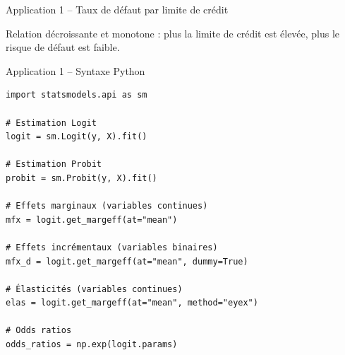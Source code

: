 \documentclass[11pt,aspectratio=169]{beamer}
\begin{document}
\begin{frame}{Application 1 -- Taux de défaut par limite de crédit}

\begin{center}
\end{center}

Relation décroissante et monotone : plus la limite de crédit est élevée,
plus le risque de défaut est faible.

\end{frame}

\begin{frame}[fragile]{Application 1 -- Syntaxe Python}

\begin{verbatim}
import statsmodels.api as sm

# Estimation Logit
logit = sm.Logit(y, X).fit()

# Estimation Probit
probit = sm.Probit(y, X).fit()

# Effets marginaux (variables continues)
mfx = logit.get_margeff(at="mean")

# Effets incrémentaux (variables binaires)
mfx_d = logit.get_margeff(at="mean", dummy=True)

# Élasticités (variables continues)
elas = logit.get_margeff(at="mean", method="eyex")

# Odds ratios
odds_ratios = np.exp(logit.params)
\end{verbatim}

\end{frame}
\end{document}
